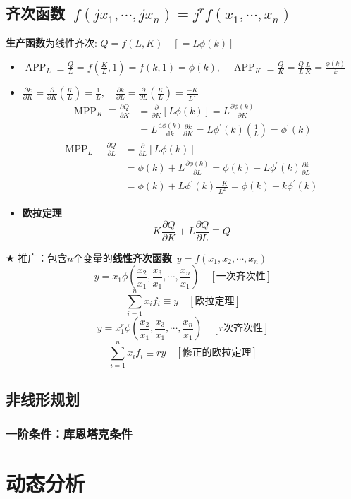\documentclass[12pt, a4paper, oneside]{article}
\begin{document}
\begin{CJK*}{UTF8}{gbsn}
%
\subsection{
齐次函数\
$
f\left(j x_{1}, \cdots, j x_{n}\right)=j^{r} f\left(x_{1}, \cdots, x_{n}\right)
$
}
\textbf{生产函数}为线性齐次:
$Q = f(L, K)\quad [=L\phi(k)]$
\begin{itemize}
	\item $
		\operatorname{APP}_L \equiv \frac{Q}{L} = f(\frac{K}{L},1)=f(k,1)=\phi(k), 
		\quad
		\operatorname{APP}_K \equiv \frac{Q}{K}=\frac{Q}{L}\frac{L}{K}=\frac{\phi(k)}{k}
		$
	\item $
		\frac{\partial k}{\partial K}=\frac{\partial}{\partial K}\left(\frac{K}{L}\right)=\frac{1}{L}, 
		\quad 
		\frac{\partial k}{\partial L}=\frac{\partial}{\partial L}\left(\frac{K}{L}\right)=\frac{-K}{L^{2}}
		$
		$$
		\begin{aligned} \operatorname{MPP}_{K} \equiv \frac{\partial Q}{\partial K} 
		& =\frac{\partial}{\partial K}[L \phi(k)] 
		 =L \frac{\partial \phi(k)}{\partial K}
		\\ & =L \frac{\mathrm{d} \phi(k)}{\mathrm{d} k} \frac{\partial k}{\partial K} 
		 =L \phi^{\prime}(k)\left(\frac{1}{L}\right)=\phi^{\prime}(k)
		\end{aligned}
		$$
		$$
		\begin{aligned} 
		\mathrm{MPP}_{L} \equiv \frac{\partial Q}{\partial L} & =\frac{\partial}{\partial L}[L \phi(k)] 
		\\ & =\phi(k)+L \frac{\partial \phi(k)}{\partial L} 
		 =\phi(k)+L \phi^{\prime}(k) \frac{\partial k}{\partial L} 
		\\ & =\phi(k)+L \phi^{\prime}(k) \frac{-K}{L^{2}} 
		 =\phi(k)-k \phi^{\prime}(k)
		\end{aligned}
		$$
	\item \textbf{欧拉定理}
		$$
		K \frac{\partial Q}{\partial K}+L \frac{\partial Q}{\partial L} \equiv Q
		$$
\end{itemize}

$\bigstar$ \quad 推广：包含$n$个变量的\textbf{线性齐次函数}\
$y=f\left(x_{1}, x_{2}, \cdots, x_{n}\right)$
$$
y=x_{1} \phi\left(\frac{x_{2}}{x_{1}}, \frac{x_{3}}{x_{1}}, \cdots, \frac{x_{n}}{x_{1}}\right)\quad [ \text{一次齐次性} ]
$$
$$
\sum_{i=1}^{n} x_{i} f_{i} \equiv y
\quad [\text{欧拉定理}]
$$
$$
y=x_{1}^{r} \phi\left(\frac{x_{2}}{x_{1}}, \frac{x_{3}}{x_{1}}, \cdots, \frac{x_{n}}{x_{1}}\right) 
\quad [r \text{次齐次性} ]
$$
$$
\sum_{i=1}^{n} x_{i} f_{i} \equiv r y
\quad [\text{修正的欧拉定理}]
$$

%
\subsection{非线形规划}
\subsubsection{一阶条件：库恩塔克条件}

\newpage
\section{动态分析}


\end{CJK*}
\bigskip
\end{document}
